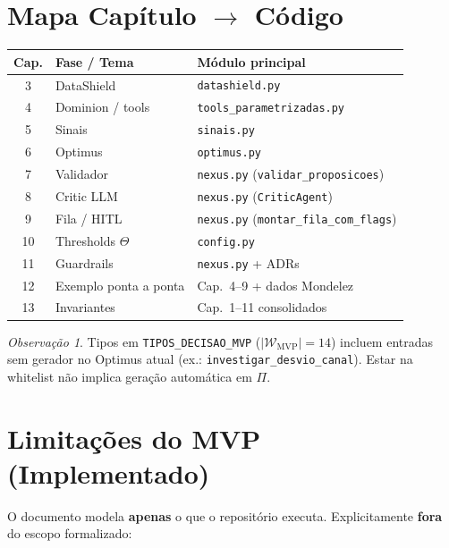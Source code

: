 \documentclass[a4paper, 12pt]{report}
\theoremstyle{definition}
\theoremstyle{remark}
\newtheorem{observacao}{Observa\c{c}\~ao}[chapter]
\begin{document}
\section{Mapa Cap\'itulo $\to$ C\'odigo}

\begin{center}
\begin{tabular}{cll}
  \toprule
  \textbf{Cap.} & \textbf{Fase / Tema} & \textbf{M\'odulo principal} \\
  \midrule
  3 & DataShield & \texttt{datashield.py} \\
  4 & Dominion / tools & \texttt{tools\_parametrizadas.py} \\
  5 & Sinais & \texttt{sinais.py} \\
  6 & Optimus & \texttt{optimus.py} \\
  7 & Validador & \texttt{nexus.py} (\texttt{validar\_proposicoes}) \\
  8 & Critic LLM & \texttt{nexus.py} (\texttt{CriticAgent}) \\
  9 & Fila / HITL & \texttt{nexus.py} (\texttt{montar\_fila\_com\_flags}) \\
  10 & Thresholds $\Theta$ & \texttt{config.py} \\
  11 & Guardrails & \texttt{nexus.py} + ADRs \\
  12 & Exemplo ponta a ponta & Cap.~4--9 + dados Mondelez \\
  13 & Invariantes & Cap.~1--11 consolidados \\
  \bottomrule
\end{tabular}
\end{center}

\begin{observacao}
  Tipos em \texttt{TIPOS\_DECISAO\_MVP} ($|\mathcal{W}_{\text{MVP}}|=14$)
  incluem entradas sem gerador no Optimus atual
  (ex.: \texttt{investigar\_desvio\_canal}). Estar na whitelist
  n\~ao implica gera\c{c}\~ao autom\'atica em $\Pi$.
\end{observacao}


\section{Limita\c{c}\~oes do MVP (Implementado)}

O documento modela \textbf{apenas} o que o reposit\'orio executa.
Explicitamente \textbf{fora} do escopo formalizado:
\end{document}
